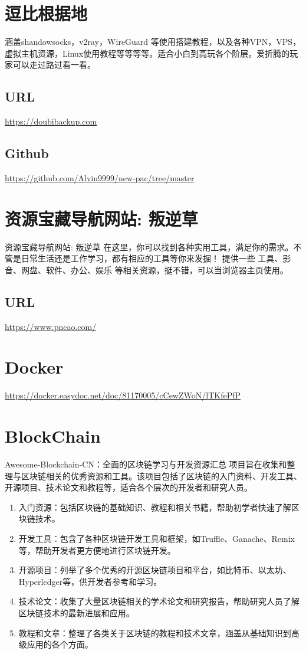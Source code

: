 \documentclass[11pt]{article}
\begin{document}
\section{逗比根据地}
\label{sec:org054550e}
涵盖shandowsocks，v2ray，WireGuard 等使用搭建教程，以及各种VPN，VPS，虚拟主机资源，Linux使用教程等等等等。适合小白到高玩各个阶层。爱折腾的玩家可以走过路过看一看。
\subsection{URL}
\label{sec:orgf9e5af9}
\url{https://doubibackup.com}
\subsection{Github}
\label{sec:orga4e5964}
\url{https://github.com/Alvin9999/new-pac/tree/master}

\section{资源宝藏导航网站: 叛逆草}
\label{sec:org5eb3bff}
资源宝藏导航网站: 叛逆草
在这里，你可以找到各种实用工具，满足你的需求。不管是日常生活还是工作学习，都有相应的工具等你来发掘！
提供一些 工具、影音、网盘、软件、办公、娱乐 等相关资源，挺不错，可以当浏览器主页使用。
\subsection{URL}
\label{sec:org744f53e}
\url{https://www.pncao.com/}

\section{Docker}
\label{sec:orge96ad56}
\url{https://docker.easydoc.net/doc/81170005/cCewZWoN/lTKfePfP}


\section{BlockChain}
\label{sec:org69e94ce}
Awesome-Blockchain-CN：全面的区块链学习与开发资源汇总
项目旨在收集和整理与区块链相关的优秀资源和工具。该项目包括了区块链的入门资料、开发工具、开源项目、技术论文和教程等，适合各个层次的开发者和研究人员。
\begin{enumerate}
\item 入门资源：包括区块链的基础知识、教程和相关书籍，帮助初学者快速了解区块链技术。
\item 开发工具：包含了各种区块链开发工具和框架，如Truffle、Ganache、Remix等，帮助开发者更方便地进行区块链开发。
\item 开源项目：列举了多个优秀的开源区块链项目和平台，如比特币、以太坊、Hyperledger等，供开发者参考和学习。
\item 技术论文：收集了大量区块链相关的学术论文和研究报告，帮助研究人员了解区块链技术的最新进展和应用。
\item 教程和文章：整理了各类关于区块链的教程和技术文章，涵盖从基础知识到高级应用的各个方面。
\end{enumerate}
\end{document}
